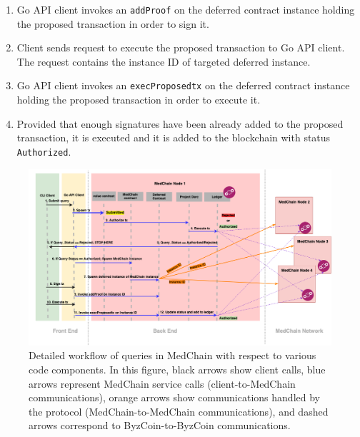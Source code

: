 \begin{enumerate}
    \item Go API client invokes an \texttt{addProof} on the deferred contract instance holding the proposed transaction in order to sign it.
    
    \item Client sends request to execute the proposed transaction to Go API client. The request contains the instance ID of targeted deferred instance.
     
    \item Go API client invokes an \texttt{execProposedtx} on the deferred contract instance holding the proposed transaction in order to execute it. 
    
    
    
    \item Provided that enough signatures have been already added to the proposed transaction, it is executed and it is added to the blockchain with status \texttt{Authorized}.
    
\end{enumerate}

\begin{figure}[htbp] 
        \centering \includegraphics[width=1\columnwidth]{Images/full-flow-presentation.png}
        \caption{\label{fig:medchain_full_flow} 
         Detailed workflow of queries in MedChain with respect to various code components. In this figure, black arrows show client calls, blue arrows represent MedChain service calls (client-to-MedChain communications), orange arrows show communications handled by the protocol (MedChain-to-MedChain communications), and dashed arrows correspond to ByzCoin-to-ByzCoin communications.
        }
\end{figure}



